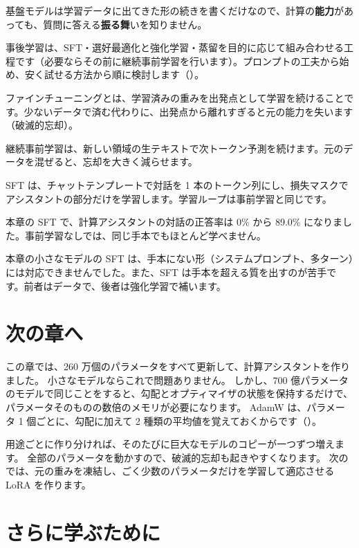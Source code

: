 \begin{summary}
\item 基盤モデルは学習データに出てきた形の続きを書くだけなので、計算の\textbf{能力}があっても、質問に答える\textbf{振る舞}いを知りません。
\item 事後学習は、SFT・選好最適化と強化学習・蒸留を目的に応じて組み合わせる工程です（必要ならその前に継続事前学習を行います）。プロンプトの工夫から始め、安く試せる方法から順に検討します（）。
\item ファインチューニングとは、学習済みの重みを出発点として学習を続けることです。少ないデータで済む代わりに、出発点から離れすぎると元の能力を失います（破滅的忘却）。
\item 継続事前学習は、新しい領域の生テキストで次トークン予測を続けます。元のデータを混ぜると、忘却を大きく減らせます。
\item SFT は、チャットテンプレートで対話を 1 本のトークン列にし、損失マスクでアシスタントの部分だけを学習します。学習ループは事前学習と同じです。
\item 本章の SFT で、計算アシスタントの対話の正答率は 0\% から 89.0\% になりました。事前学習なしでは、同じ手本でもほとんど学べません。
\item 本章の小さなモデルの SFT は、手本にない形（システムプロンプト、多ターン）には対応できませんでした。また、SFT は手本を超える質を出すのが苦手です。前者はデータで、後者は強化学習で補います。
\end{summary}

\section*{次の章へ}

この章では、260 万個のパラメータをすべて更新して、計算アシスタントを作りました。
小さなモデルならこれで問題ありません。
しかし、700 億パラメータのモデルで同じことをすると、勾配とオプティマイザの状態を保持するだけで、パラメータそのものの数倍のメモリが必要になります。
AdamW は、パラメータ 1 個ごとに、勾配に加えて 2 種類の平均値を覚えておくからです（）。

用途ごとに作り分ければ、そのたびに巨大なモデルのコピーが一つずつ増えます。
全部のパラメータを動かすので、破滅的忘却も起きやすくなります。
次のでは、元の重みを凍結し、ごく少数のパラメータだけを学習して適応させる LoRA を作ります。

\section*{さらに学ぶために}

